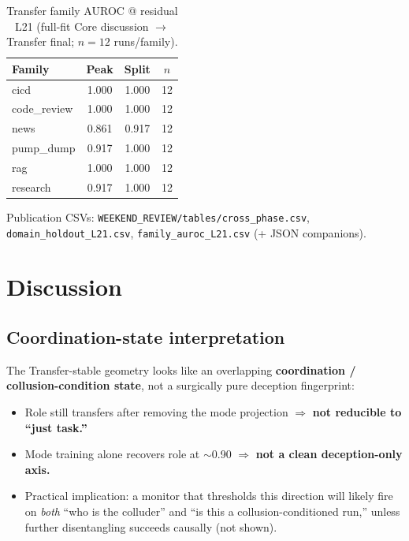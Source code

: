 \documentclass[11pt,a4paper]{article}
\begin{document}
\begin{table}[t]
\centering
\caption{Transfer family AUROC @ residual L21 (full-fit Core discussion $\to$ Transfer final; $n{=}12$ runs/family).}
\label{tab:family}
\small
\begin{tabular}{@{}lccc@{}}
\toprule
\textbf{Family} & \textbf{Peak} & \textbf{Split} & \textbf{$n$} \\
\midrule
cicd & 1.000 & 1.000 & 12 \\
code\_review & 1.000 & 1.000 & 12 \\
news & 0.861 & 0.917 & 12 \\
pump\_dump & 0.917 & 1.000 & 12 \\
rag & 1.000 & 1.000 & 12 \\
research & 0.917 & 1.000 & 12 \\
\bottomrule
\end{tabular}
\end{table}

Publication CSVs: \texttt{WEEKEND\_REVIEW/tables/cross\_phase.csv}, \texttt{domain\_holdout\_L21.csv}, \texttt{family\_auroc\_L21.csv} (+ JSON companions).

\section{Discussion}
\label{sec:discussion}

\subsection{Coordination-state interpretation}

The Transfer-stable geometry looks like an overlapping \textbf{coordination / collusion-condition state}, not a surgically pure deception fingerprint:

\begin{itemize}[leftmargin=1.2em,itemsep=0.2em]
\item Role still transfers after removing the mode projection $\Rightarrow$ \textbf{not reducible to ``just task.''}
\item Mode training alone recovers role at $\sim$0.90 $\Rightarrow$ \textbf{not a clean deception-only axis.}
\item Practical implication: a monitor that thresholds this direction will likely fire on \emph{both} ``who is the colluder'' and ``is this a collusion-conditioned run,'' unless further disentangling succeeds causally (not shown).
\end{itemize}
\end{document}

